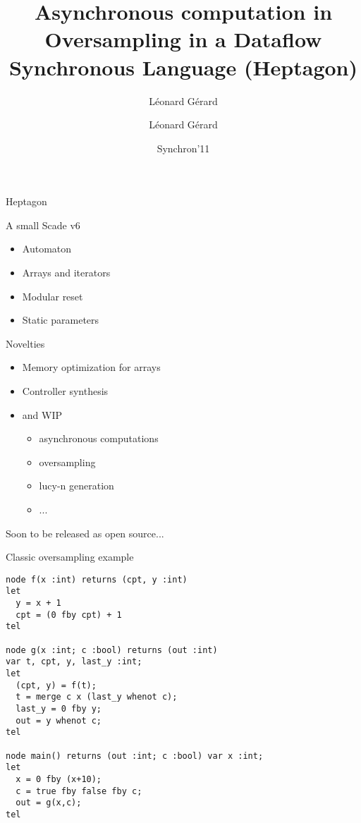 \documentclass[xcolor=dvipsnames]{beamer}
\title{Asynchronous computation in \lustre}
\author{L\'eonard G\'erard}
\title{Oversampling in a Dataflow Synchronous Language (Heptagon)}
\author{Léonard Gérard\inst{1}}
\institute[Universities of]
{
\inst{1}%
PARKAS team\\
ENS}
\date{Synchron'11}
\begin{document}
\begin{frame}
\titlepage
\end{frame}

\begin{frame}[fragile]{Heptagon}
\begin{block}{A small Scade v6}
\begin{itemize}
      \item Automaton
      \item Arrays and iterators
      \item Modular reset
      \item Static parameters
\end{itemize}
\end{block}
\begin{block}{Novelties}
\begin{itemize}
  \item Memory optimization for arrays
  \item Controller synthesis
  \item and WIP
    \begin{itemize}
      \item asynchronous computations
      \item oversampling
      \item lucy-n generation
      \item ...
    \end{itemize}
\end{itemize}
\end{block}
Soon to be released as open source...
\end{frame}

\begin{frame}[fragile]{Classic oversampling example}
\begin{lstlisting}[escapechar=!]
node f(x :int) returns (cpt, y :int)
let
  y = x + 1
  cpt = (0 fby cpt) + 1
tel

node g(x :int; c :bool) returns (out :int)
var t, cpt, y, last_y :int;
let
  (cpt, y) = f(t);
  t = merge c x (last_y whenot c);
  last_y = 0 fby y;
  out = y whenot c;
tel

node main() returns (out :int; c :bool) var x :int;
let
  x = 0 fby (x+10);
  c = true fby false fby c;
  out = g(x,c);
tel
\end{lstlisting}
\end{frame}
\end{document}
